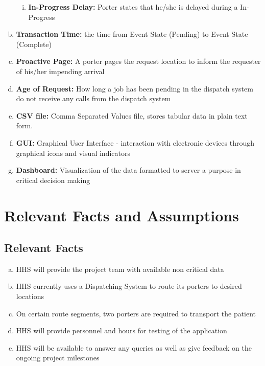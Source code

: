 \documentclass[paper=letter, fontsize=10pt]{scrartcl}
\numberwithin{equation}{section}		%
\numberwithin{figure}{section}			%
\numberwithin{table}{section}				%
\begin{document}
\begin{enumerate}[(a)]
\begin{enumerate}[(i)]
		\item \textbf{In-Progress Delay:} Porter states that he/she is delayed during a In-Progress		
	\end{enumerate} 
	\item \textbf{Transaction Time:} the time from Event State (Pending) to Event State (Complete)
	\item \textbf{Proactive Page:} A porter pages the request location to inform the requester of his/her impending arrival      
	\item \textbf{Age of Request:} How long a job has been pending in the dispatch system
	 do not receive any calls from the dispatch system
	\item \textbf{CSV file:} Comma Separated Values file, stores tabular data in plain text form. 
	\item \textbf{GUI:} Graphical User Interface - interaction with electronic devices through graphical icons and visual indicators
	\item \textbf{Dashboard:} Visualization of the data formatted to server a purpose in critical decision making
\end{enumerate}

\section{Relevant Facts and Assumptions}
\subsection{Relevant Facts}
\begin{enumerate}[(a)]
	\item HHS will provide the project team with available non critical data
	\item HHS currently uses a Dispatching System to route its porters to desired locations
	\item On certain route segments, two porters are required to transport the patient 
	\item HHS will provide personnel and hours for testing of the application
	\item HHS will be available to answer any queries as well as give feedback on the ongoing project milestones
\end{enumerate}
\end{document}
